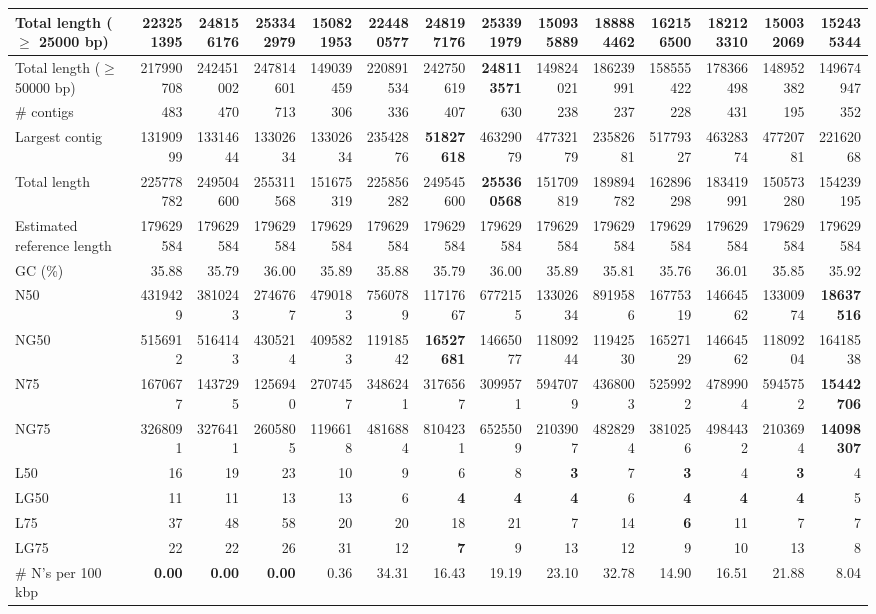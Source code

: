\documentclass[12pt,a4paper]{article}
\begin{document}
\begin{table}[ht]
\begin{center}
\begin{tabular}{|l*{13}{|r}|}
Total length ($\geq$ 25000 bp) & 223251395 & 248156176 & 253342979 & 150821953 & 224480577 & 248197176 & {\bf 253391979} & 150935889 & 188884462 & 162156500 & 182123310 & 150032069 & 152435344 \\ \hline
Total length ($\geq$ 50000 bp) & 217990708 & 242451002 & 247814601 & 149039459 & 220891534 & 242750619 & {\bf 248113571} & 149824021 & 186239991 & 158555422 & 178366498 & 148952382 & 149674947 \\ \hline
\# contigs & 483 & 470 & 713 & 306 & 336 & 407 & 630 & 238 & 237 & 228 & 431 & 195 & 352 \\ \hline
Largest contig & 13190999 & 13314644 & 13302634 & 13302634 & 23542876 & {\bf 51827618} & 46329079 & 47732179 & 23582681 & 51779327 & 46328374 & 47720781 & 22162068 \\ \hline
Total length & 225778782 & 249504600 & 255311568 & 151675319 & 225856282 & 249545600 & {\bf 255360568} & 151709819 & 189894782 & 162896298 & 183419991 & 150573280 & 154239195 \\ \hline
Estimated reference length & 179629584 & 179629584 & 179629584 & 179629584 & 179629584 & 179629584 & 179629584 & 179629584 & 179629584 & 179629584 & 179629584 & 179629584 & 179629584 \\ \hline
GC (\%) & 35.88 & 35.79 & 36.00 & 35.89 & 35.88 & 35.79 & 36.00 & 35.89 & 35.81 & 35.76 & 36.01 & 35.85 & 35.92 \\ \hline
N50 & 4319429 & 3810243 & 2746767 & 4790183 & 7560789 & 11717667 & 6772155 & 13302634 & 8919586 & 16775319 & 14664562 & 13300974 & {\bf 18637516} \\ \hline
NG50 & 5156912 & 5164143 & 4305214 & 4095823 & 11918542 & {\bf 16527681} & 14665077 & 11809244 & 11942530 & 16527129 & 14664562 & 11809204 & 16418538 \\ \hline
N75 & 1670677 & 1437295 & 1256940 & 2707457 & 3486241 & 3176567 & 3099571 & 5947079 & 4368003 & 5259922 & 4789904 & 5945752 & {\bf 15442706} \\ \hline
NG75 & 3268091 & 3276411 & 2605805 & 1196618 & 4816884 & 8104231 & 6525509 & 2103907 & 4828294 & 3810256 & 4984432 & 2103694 & {\bf 14098307} \\ \hline
L50 & 16 & 19 & 23 & 10 & 9 & 6 & 8 & {\bf 3} & 7 & {\bf 3} & 4 & {\bf 3} & 4 \\ \hline
LG50 & 11 & 11 & 13 & 13 & 6 & {\bf 4} & {\bf 4} & {\bf 4} & 6 & {\bf 4} & {\bf 4} & {\bf 4} & 5 \\ \hline
L75 & 37 & 48 & 58 & 20 & 20 & 18 & 21 & 7 & 14 & {\bf 6} & 11 & 7 & 7 \\ \hline
LG75 & 22 & 22 & 26 & 31 & 12 & {\bf 7} & 9 & 13 & 12 & 9 & 10 & 13 & 8 \\ \hline
\# N's per 100 kbp & {\bf 0.00} & {\bf 0.00} & {\bf 0.00} & 0.36 & 34.31 & 16.43 & 19.19 & 23.10 & 32.78 & 14.90 & 16.51 & 21.88 & 8.04 \\ \hline
\end{tabular}
\end{center}
\end{table}
\end{document}
